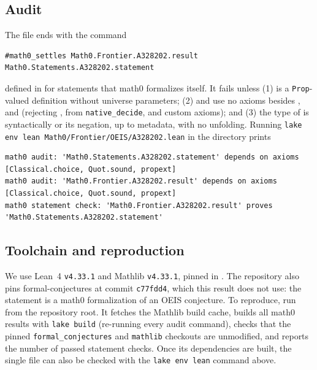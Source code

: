 \documentclass[11pt]{amsart}
\theoremstyle{plain}
\theoremstyle{definition}
\begin{document}
\subsection*{Audit}
The file ends with the command
\begin{lstlisting}
#math0_settles Math0.Frontier.A328202.result Math0.Statements.A328202.statement
\end{lstlisting}
defined in  for statements that math0 formalizes itself. It fails unless (1)  is a \texttt{Prop}-valued definition without universe parameters; (2)  and  use no axioms besides ,  and  (rejecting ,  from \texttt{native\_decide}, and custom axioms); and (3) the type of  is syntactically  or its negation, up to metadata, with no unfolding. Running \texttt{lake env lean Math0/Frontier/OEIS/A328202.lean} in the directory  prints
\begin{lstlisting}[basicstyle=\ttfamily\scriptsize]
math0 audit: 'Math0.Statements.A328202.statement' depends on axioms [Classical.choice, Quot.sound, propext]
math0 audit: 'Math0.Frontier.A328202.result' depends on axioms [Classical.choice, Quot.sound, propext]
math0 statement check: 'Math0.Frontier.A328202.result' proves 'Math0.Statements.A328202.statement'
\end{lstlisting}

\subsection*{Toolchain and reproduction}
We use Lean~4 \cite{Lean4} \texttt{v4.33.1} and Mathlib \cite{Mathlib} \texttt{v4.33.1}, pinned in . The repository also pins formal-conjectures \cite{FC} at commit \texttt{c77fdd4}, which this result does not use: the statement is a math0 formalization of an OEIS conjecture.
To reproduce, run  from the repository root. It fetches the Mathlib build cache, builds all math0 results with \texttt{lake build} (re-running every audit command), checks that the pinned \texttt{formal\_conjectures} and \texttt{mathlib} checkouts are unmodified, and reports the number of passed statement checks. Once its dependencies are built, the single file can also be checked with the \texttt{lake env lean} command above.
\end{document}
